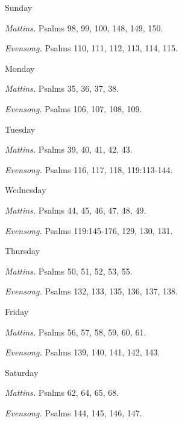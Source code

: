 \begin{paracol}{2}
\begin{leftcolumn}
	\end{leftcolumn}
	\begin{rightcolumn}
		\begin{inhead}
			Sunday
		\end{inhead}\par\noindent
		\textit{Mattins.} Psalms 98, 99, 100, 148, 149, 150.\par\noindent
		\textit{Evensong.} Psalms 110, 111, 112, 113, 114, 115.\par
		\begin{inhead}
			Monday
		\end{inhead}\par\noindent
		\textit{Mattins.} Psalms 35, 36, 37, 38.\par\noindent
		\textit{Evensong}. Psalms 106, 107, 108, 109.\par
		\begin{inhead}
			Tuesday
		\end{inhead}\par\noindent
		\textit{Mattins.} Psalms 39, 40, 41, 42, 43.\par\noindent
		\textit{Evensong.} Psalms 116, 117, 118, 119:113-144.\par
		\begin{inhead}
			Wednesday
		\end{inhead}\par\noindent
		\textit{Mattins.} Psalms 44, 45, 46, 47, 48, 49.\par\noindent
		\textit{Evensong.} Psalms 119:145-176, 129, 130, 131.\par
		\begin{inhead}
			Thursday
		\end{inhead}\par\noindent
		\textit{Mattins.} Psalms 50, 51, 52, 53, 55.\par\noindent
		\textit{Evensong.} Psalms 132, 133, 135, 136, 137, 138.\par
		\begin{inhead}
			Friday
		\end{inhead}\par\noindent
		\textit{Mattins.} Psalms 56, 57, 58, 59, 60, 61.\par\noindent
		\textit{Evensong.} Psalms 139, 140, 141, 142, 143.\par
		\begin{inhead}
			Saturday
		\end{inhead}\par\noindent
		\textit{Mattins.} Psalms 62, 64, 65, 68.\par\noindent
		\textit{Evensong.} Psalms 144, 145, 146, 147.\par
	\end{rightcolumn}
	\switchcolumn*
\end{paracol}
